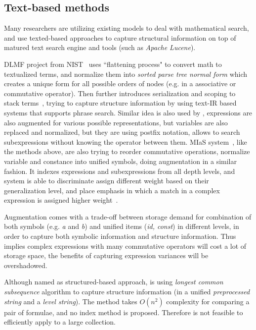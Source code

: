 \subsection{Text-based methods}
Many researchers are utilizing existing models to deal with mathematical search, and use texted-based approaches to capture structural information on top of matured text search engine and tools (such as \textit{Apache Lucene}). 

DLMF project from NIST~\cite{Youssef03} uses ``flattening process" to convert math to textualized terms, and normalize them into \textit{sorted parse tree normal form} which creates a unique form for all possible orders of nodes (e.g. in a associative or commutative operator). 
Then further introduces serialization and scoping to stack terms~\cite{Youssef05}, trying to capture structure information by using text-IR based systems that supports phrase search. 
Similar idea is also used by \cite{extending08}, expressions are also augmented for various possible representations, but variables are also replaced and normalized, but they are using postfix notation, allows to search subexpressions without knowing the operator between them.  
MIaS system~\cite{mias11a,mias11,mias:thesis}, like the methods above, are also trying to reorder commutative operations, normalize variable and constance into unified symbols, doing augmentation in a similar fashion. 
It indexes expressions and subexpressions from all depth levels, and system is able to discriminate assign different weight based on their generalization level, and place emphasis in which a match in a complex expression is assigned higher weight~\cite{mias:thesis}.

Augmentation comes with a trade-off between storage demand for combination of both symbols (e.g. \textit{a} and \textit{b}) and unified items (\textit{id, const}) in different levels, in order to capture both symbolic information and structure information. Thus implies complex expressions with many commutative operators will cost a lot of storage space, the benefits of capturing expression variances will be overshadowed.

Although named as structured-based approach, \cite{not-really-struct} is using \textit{longest common subsequence} algorithm to capture structure information (in a unified \textit{preprocessed string} and a \textit{level string}). The method takes $O(n^2)$ complexity for comparing a pair of formulae, and no index method is proposed. Therefore is not feasible to efficiently apply to a large collection.

